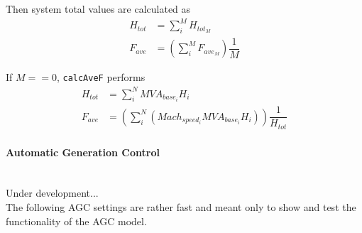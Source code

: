 \documentclass[12pt]{article}
\begin{document}
Then system total values are calculated as
\begin{align*}
H_{tot} &= \sum_{i}^{M} H_{tot_M} \\
F_{ave} &= \left( \sum_{i}^{M} F_{ave_M} \right) \dfrac{1}{M}
\end{align*}

If $M==0$, \verb|calcAveF| performs
\begin{align*}
H_{tot} &= \sum_{i}^{N} MVA_{base_i}H_i \\
F_{ave} &= \left( \sum_{i}^{N}(Mach_{speed_i}MVA_{base_i}H_i) \right) \dfrac{1}{H_{tot}}
\end{align*}

\pagebreak
\paragraph{Automatic Generation Control} \ \\
Under development...\\
The following AGC settings are rather fast and meant only to show and test the  functionality of the AGC model.
\end{document}
